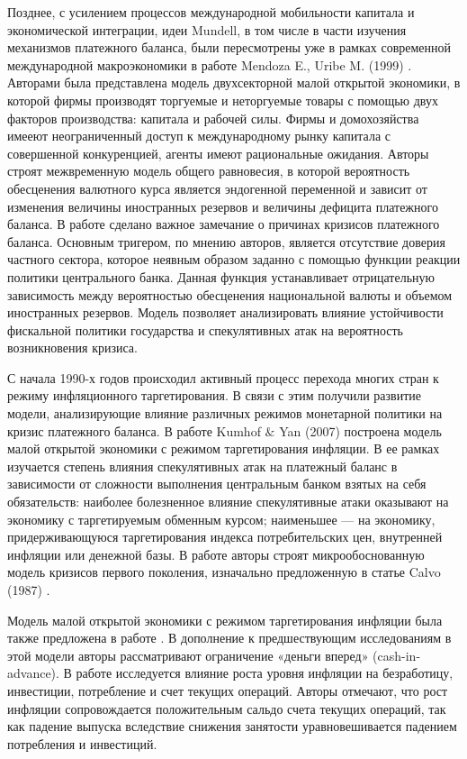 \documentclass[a4paper, 14pt]{extarticle}
\begin{document}
Позднее, с усилением процессов международной мобильности капитала и экономической интеграции, идеи Mundell, в том числе в части изучения механизмов платежного баланса, были пересмотрены уже в рамках современной  международной макроэкономики в работе Mendoza E., Uribe M. (1999) \autocite{mendoza1999business}. 
Авторами была представлена модель двухсекторной малой открытой экономики, в которой фирмы производят торгуемые и неторгуемые товары с помощью двух факторов производства: капитала и рабочей силы. 
Фирмы и домохозяйства имееют неограниченный доступ к международному рынку капитала с совершенной конкуренцией, агенты имеют рациональные ожидания. 
Авторы строят межвременную модель общего равновесия, в которой вероятность обесценения валютного курса является эндогенной переменной и зависит от изменения величины иностранных резервов и величины дефицита платежного баланса.  
В работе сделано важное замечание о причинах кризисов платежного баланса.
Основным тригером, по мнению авторов, является отсутствие доверия частного сектора, которое неявным образом заданно с помощью функции реакции политики центрального банка. 
Данная функция устанавливает отрицательную зависимость между вероятностью обесценения национальной валюты и объемом иностранных резервов. 
Модель позволяет анализировать влияние устойчивости фискальной политики государства и  спекулятивных атак на вероятность возникновения кризиса.

С начала 1990-х годов происходил активный процесс перехода многих стран к режиму инфляционного таргетирования. 
В связи с этим получили развитие модели, анализирующие влияние различных режимов монетарной политики на кризис платежного баланса.  
В работе Kumhof $\&$ Yan (2007) \autocite{kumhof2007balance} построена модель малой открытой экономики с режимом таргетирования инфляции.
В ее рамках изучается степень влияния спекулятивных атак на платежный баланс в зависимости от сложности выполнения центральным банком взятых на себя обязательств: наиболее болезненное влияние спекулятивные атаки оказывают на экономику с таргетируемым обменным курсом; наименьшее — на экономику, придерживающуюся таргетирования индекса потребительских цен, внутренней инфляции или денежной базы. 
В работе авторы строят микрообоснованную модель кризисов первого поколения, изначально предложенную в статье Calvo (1987) \autocite{calvo1987balance}.

Модель малой открытой экономики с режимом таргетирования инфляции была также предложена в работе \autocite{mansoorian2006employment}.
В дополнение к предшествующим исследованиям в этой модели авторы рассматривают ограничение «деньги вперед» (cash-in-advance). 
В работе исследуется влияние роста уровня инфляции на безработицу, инвестиции, потребление и счет текущих операций. 
Авторы отмечают, что рост инфляции сопровождается положительным сальдо счета текущих операций, так как падение выпуска вследствие снижения занятости уравновешивается падением потребления и инвестиций.
\end{document}
